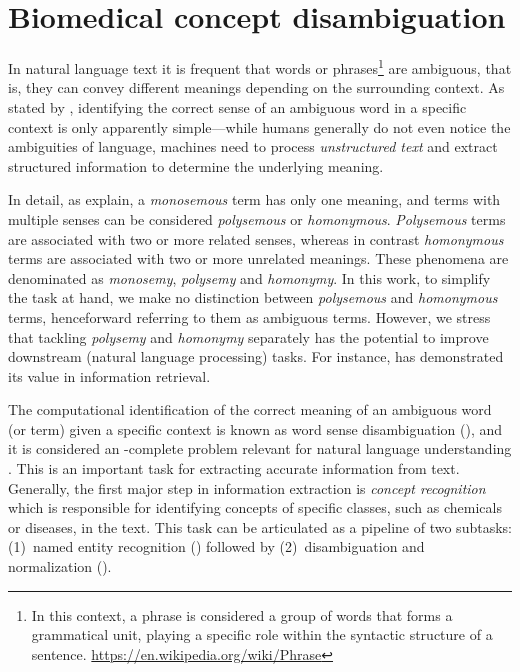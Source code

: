 \chapter{Biomedical concept disambiguation}
\label{c3}

In natural language text it is frequent that words or phrases\footnote{In this context, a phrase is considered a group of words that forms a grammatical unit, playing a specific role within the syntactic structure of a sentence. \url{https://en.wikipedia.org/wiki/Phrase}} are ambiguous, that is, they can convey different meanings depending on the surrounding context.
As stated by \textcite{navigli2009a}, identifying the correct sense of an ambiguous word in a specific context is only apparently simple---while humans generally do not even notice the ambiguities of language, machines need to process \textit{unstructured text} and extract structured information to determine the underlying meaning.

In detail, as \textcite{vicente2017a} explain, a \textit{monosemous} term has only one meaning, and terms with multiple senses can be considered \textit{polysemous} or \textit{homonymous}.
\textit{Polysemous} terms are associated with two or more related senses, whereas in contrast \textit{homonymous} terms are associated with two or more unrelated meanings.
These phenomena are denominated as \textit{monosemy}, \textit{polysemy} and \textit{homonymy}.
In this work, to simplify the task at hand, we make no distinction between \textit{polysemous} and \textit{homonymous} terms, henceforward referring to them as ambiguous terms.
However, we stress that tackling \textit{polysemy} and \textit{homonymy} separately has the potential to improve downstream  (natural language processing) tasks.
For instance, \textcite{krovetz1997a} has demonstrated its value in information retrieval.

The computational identification of the correct meaning of an ambiguous word (or term) given a specific context is known as word sense disambiguation (), and it is considered an -complete problem relevant for natural language understanding \parencite{navigli2009a,ide1998a}.
This is an important task for extracting accurate information from text.
Generally, the first major step in information extraction is \textit{concept recognition} which is responsible for identifying concepts of specific classes, such as chemicals or diseases, in the text.
This task can be articulated as a pipeline of two subtasks: (1)~named entity recognition () followed by (2)~disambiguation and normalization  ().

